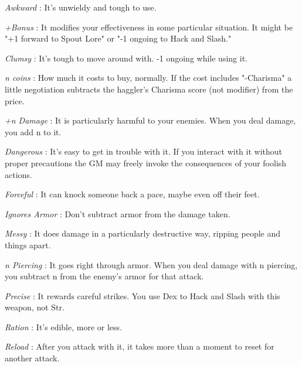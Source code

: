        

         {\em Awkward} : It's unwieldy and tough to use. 

       

         {\em +Bonus} : It modifies your effectiveness in some particular situation. It might be "+1 forward to Spout Lore" or "-1 ongoing to Hack and Slash."

       

         {\em Clumsy} : It's tough to move around with. -1 ongoing while using it.

       

         {\em n coins} : How much it costs to buy, normally. If the cost includes "-Charisma" a little negotiation subtracts the haggler's Charisma score (not modifier) from the price.

       

         {\em +n Damage} : It is particularly harmful to your enemies. When you deal damage, you add n to it.

       

         {\em Dangerous} : It's easy to get in trouble with it. If you interact with it without proper precautions the GM may freely invoke the consequences of your foolish actions.

       

         {\em Forceful} : It can knock someone back a pace, maybe even off their feet. 

       

         {\em Ignores Armor} : Don't subtract armor from the damage taken.

       

         {\em Messy} : It does damage in a particularly destructive way, ripping people and things apart.

       

         {\em n Piercing} : It goes right through armor. When you deal damage with n piercing, you subtract n from the enemy's armor for that attack. 

       

         {\em Precise} : It rewards careful strikes. You use Dex to Hack and Slash with this weapon, not Str.

       

         {\em Ration} : It's edible, more or less.

       

         {\em Reload} : After you attack with it, it takes more than a moment to reset for another attack. 

